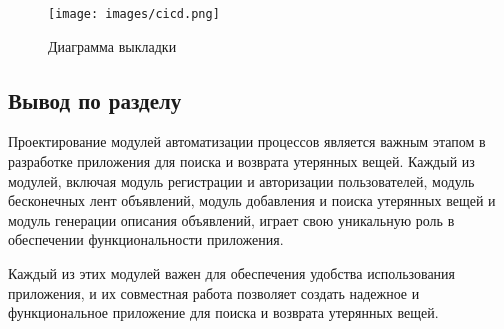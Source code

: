 \begin{figure}[htb]
	\centering
	\texttt{[image: images/cicd.png]}
	\parskip=6pt
	\caption{Диаграмма выкладки}
	\label{fig:cicd}
\end{figure}

\subsection*{Вывод по разделу}

Проектирование модулей автоматизации процессов является важным этапом в разработке приложения для поиска и возврата утерянных вещей. Каждый из модулей, включая модуль регистрации и авторизации пользователей, модуль бесконечных лент объявлений, модуль добавления и поиска утерянных вещей и модуль генерации описания объявлений, играет свою уникальную роль в обеспечении функциональности приложения.

Каждый из этих модулей важен для обеспечения удобства использования приложения, и их совместная работа позволяет создать надежное и функциональное приложение для поиска и возврата утерянных вещей.
